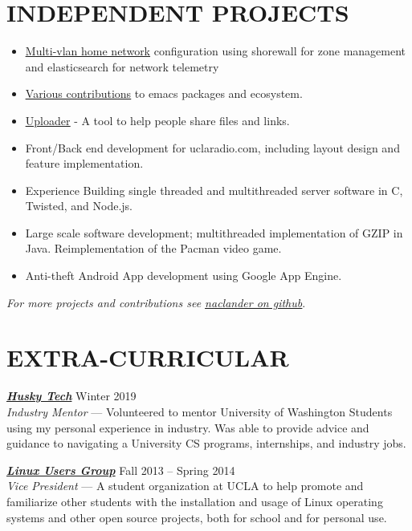 \documentclass[line,letterpaper]{resume}
\begin{document}
\begin{resume}
    \section{\uppercase{Independent Projects}}
	\begin{itemize}
        \item \underline{\href{https://aclander.com/home_lab.svg}
            {Multi-vlan home network}} configuration using shorewall for zone management
          and elasticsearch for network telemetry
        \item
        \underline{\href{https://tinyurl.com/la495b3}{Various contributions}}
        to emacs packages and ecosystem.
	\item \underline{\href{https://github.com/naclander/uploader}{Uploader}} -
	A tool to help people share files and links.
	\item Front/Back end development for uclaradio.com, including layout design
	      and feature implementation.
	\item Experience Building single threaded and multithreaded server software
	      in C, Twisted, and Node.js.
	\item Large scale software development; multithreaded implementation of GZIP
	      in Java. Reimplementation of the Pacman video game.
	\item Anti-theft Android App development using Google App Engine.
	\end{itemize}
    \vspace{-6pt}

    \hfill \emph{For more projects and contributions see
    \underline{\href{https://github.com/naclander}{naclander on github}}}.

    \vspace{-15pt}

\section{\uppercase{Extra-Curricular}}
    {\sl\textbf{\href{https://www.uwhuskytech.com/}{Husky Tech}}} \hfill Winter 2019 \\
      \emph{Industry Mentor} --- Volunteered to mentor University of Washington Students
      using my personal experience in industry. Was able to provide advice and guidance to
      navigating a University CS programs, internships, and industry jobs.

    {\sl\textbf{\href{http://linux.ucla.edu}{Linux Users Group}}} \hfill Fall 2013 -- Spring 2014\\
    \emph{Vice President} --- A student organization at UCLA to help promote
	and familiarize other students with the installation and usage of Linux
	operating systems and other open source projects, both for school and for personal use.


   \end{resume}
\end{document}
